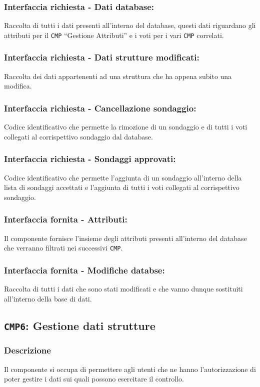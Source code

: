         \subsubsection{Interfaccia richiesta - Dati database:}
            Raccolta di tutti i dati presenti all'interno del database, questi dati riguardano gli attributi per il \texttt{CMP} ``Gestione Attributi'' e i voti per i vari \texttt{CMP} correlati.
        \subsubsection{Interfaccia richiesta - Dati strutture modificati:}
            Raccolta dei dati appartenenti ad una struttura che ha appena subito una modifica.
        \subsubsection{Interfaccia richiesta - Cancellazione sondaggio:}
            Codice identificativo che permette la rimozione di un sondaggio e di tutti i voti collegati al corrispettivo sondaggio dal database.
        \subsubsection{Interfaccia richiesta - Sondaggi approvati:}
            Codice identificativo che permette l'aggiunta di un sondaggio all'interno della lista di sondaggi accettati e l'aggiunta di tutti i voti collegati al corrispettivo sondaggio.
        \subsubsection{Interfaccia fornita - Attributi:}
            Il componente fornisce l'insieme degli attributi presenti all'interno del database che verranno filtrati nei successivi \texttt{CMP}.
        \subsubsection{Interfaccia fornita - Modifiche databse:}
            Raccolta di tutti i dati che sono stati modificati e che vanno dunque sostituiti all'interno della base di dati.
    
    \subsection{\texttt{CMP6}: Gestione dati strutture}
        \subsubsection{Descrizione}
            Il componente si occupa di permettere agli utenti che ne hanno l'autorizzazione di poter gestire i dati sui quali possono esercitare il controllo.
